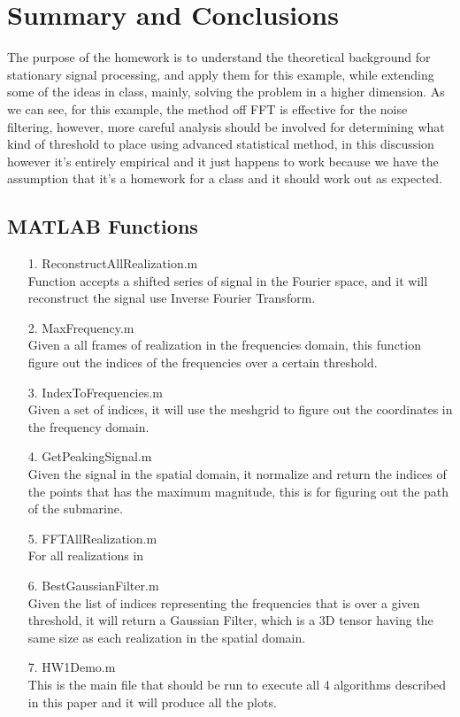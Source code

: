 \documentclass{article}
\begin{document}
\newpage
\section{Summary and Conclusions}
    \hspace{1.1em}
    The purpose of the homework is to understand the theoretical background for stationary signal processing, and apply them for this example, while extending some of the ideas in class, mainly, solving the problem in a higher dimension. As we can see, for this example, the method off FFT is effective for the noise filtering, however, more careful analysis should be involved for determining what kind of threshold to place using advanced statistical method, in this discussion however it's entirely empirical and it just happens to work because we have the assumption that it's a homework for a class and it should work out as expected. 

\printbibliography

\begin{appendices}

\section{MATLAB Functions}
    \begin{enumerate}
        \item[1.] ReconstructAllRealization.m \\
        Function accepts a shifted series of signal in the Fourier space, and it will reconstruct the signal use Inverse Fourier Transform.  
        \item[2.] MaxFrequency.m \\
        Given a all frames of realization in the frequencies domain, this function figure out the indices of the frequencies over a certain threshold. 
        \item[3.] IndexToFrequencies.m \\
        Given a set of indices, it will use the meshgrid to figure out the coordinates in the frequency domain. 
        \item[4.] GetPeakingSignal.m \\
        Given the signal in the spatial domain, it normalize and return the indices of the points that has the maximum magnitude, this is for figuring out the path of the submarine. 
        \item[5.] FFTAllRealization.m \\
        For all realizations in 
        \item[6.] BestGaussianFilter.m \\
        Given the list of indices representing the frequencies that is over a given threshold, it will return a Gaussian Filter, which is a 3D tensor having the same size as each realization in the spatial domain. 
        \item [7.] HW1Demo.m \\
        This is the main file that should be run to execute all 4 algorithms described in this paper and it will produce all the plots.
    \end{enumerate}


    
\end{appendices}
\end{document}
